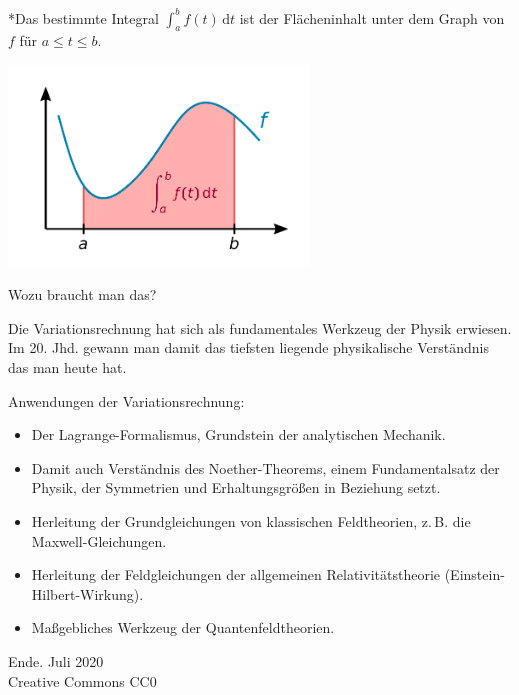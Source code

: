 \documentclass{beamer}
\newcommand{\modest}[1]{{\small\color{gray}#1}}
\begin{document}
\begin{frame}

{\footnotesize
*Das bestimmte Integral $\int_a^b f(t)\,\mathrm dt$
ist der Flächeninhalt unter dem Graph von $f$ für $a\le t\le b$.}
\begin{center}
\includegraphics[width=80mm]{img/Integral.pdf}
\end{center}
\end{frame}

\begin{frame}
Wozu braucht man das?\pause

\vspace{0.8em}
Die Variationsrechnung hat sich als fundamentales Werkzeug der Physik
erwiesen. Im 20. Jhd. gewann man damit das tiefsten liegende
physikalische Verständnis das man heute hat.
\end{frame}

\begin{frame}
Anwendungen der Variationsrechnung:
\begin{itemize}
\item Der Lagrange-Formalismus, Grundstein der analytischen Mechanik.

\item Damit auch Verständnis des Noether-Theorems, einem
Fundamentalsatz der Physik, der Symmetrien und Erhaltungsgrößen
in Beziehung setzt.

\item Herleitung der Grundgleichungen von klassischen Feldtheorien,
z.\,B. die Maxwell-Gleichungen.

\item Herleitung der Feldgleichungen der allgemeinen
Relativitätstheorie (Einstein-Hilbert-Wirkung).

\item Maßgebliches Werkzeug der Quantenfeldtheorien.
\end{itemize}
\end{frame}

\begin{frame}
Ende.
\vfill\hfill\modest{Juli 2020}\\
\hfill\modest{Creative Commons CC0}
\end{frame}
\end{document}
